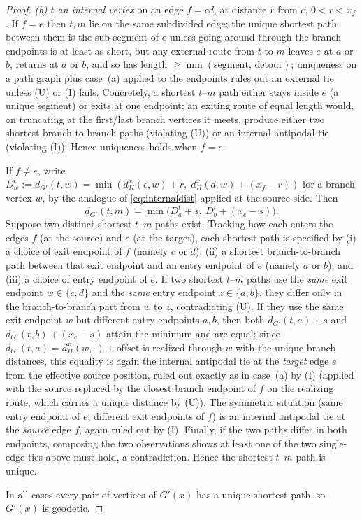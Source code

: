 \documentclass{amsart}
\theoremstyle{definition}
\begin{document}
\begin{proof}
\emph{(b) $t$ an internal vertex} on an edge $f=cd$, at distance $r$ from $c$,
$0<r<x_f$. If $f=e$ then $t,m$ lie on the same subdivided edge; the unique
shortest path between them is the sub-segment of $e$ unless going around through
the branch endpoints is at least as short, but any external route from $t$ to
$m$ leaves $e$ at $a$ or $b$, returns at $a$ or $b$, and so has length
$\ge\min(\text{segment},\,\text{detour})$; uniqueness on a path graph plus
case~(a) applied to the endpoints rules out an external tie unless (U) or (I)
fails. Concretely, a shortest $t$--$m$ path either stays inside $e$ (a unique
segment) or exits at one endpoint; an exiting route of equal length would, on
truncating at the first/last branch vertices it meets, produce either two
shortest branch-to-branch paths (violating (U)) or an internal antipodal tie
(violating (I)). Hence uniqueness holds when $f=e$.

If $f\ne e$, write $D^t_w:=d_{G'}(t,w)=\min(d^x_H(c,w)+r,\;d^x_H(d,w)+(x_f-r))$
for a branch vertex $w$, by the analogue of \eqref{eq:internaldist} applied at
the source side. Then
\[
d_{G'}(t,m)=\min\big(D^t_a+s,\ D^t_b+(x_e-s)\big).
\]
Suppose two distinct shortest $t$--$m$ paths exist. Tracking how each enters the
edges $f$ (at the source) and $e$ (at the target), each shortest path is
specified by (i) a choice of exit endpoint of $f$ (namely $c$ or $d$), (ii) a
shortest branch-to-branch path between that exit endpoint and an entry endpoint
of $e$ (namely $a$ or $b$), and (iii) a choice of entry endpoint of $e$. If two
shortest $t$--$m$ paths use the \emph{same} exit endpoint $w\in\{c,d\}$ and the
\emph{same} entry endpoint $z\in\{a,b\}$, they differ only in the
branch-to-branch part from $w$ to $z$, contradicting (U). If they use the same
exit endpoint $w$ but different entry endpoints $a,b$, then both
$d_{G'}(t,a)+s$ and $d_{G'}(t,b)+(x_e-s)$ attain the minimum and are equal; since
$d_{G'}(t,a)=d^x_H(w,\cdot)+\text{offset}$ is realized through $w$ with the unique
branch distances, this equality is again the internal antipodal tie at the
\emph{target} edge $e$ from the effective source position, ruled out exactly as
in case~(a) by (I) (applied with the source replaced by the closest branch
endpoint of $f$ on the realizing route, which carries a unique distance by (U)).
The symmetric situation (same entry endpoint of $e$, different exit endpoints of
$f$) is an internal antipodal tie at the \emph{source} edge $f$, again ruled out
by (I). Finally, if the two paths differ in both endpoints, composing the two
observations shows at least one of the two single-edge ties above must hold, a
contradiction. Hence the shortest $t$--$m$ path is unique.

In all cases every pair of vertices of $G'(x)$ has a unique shortest path, so
$G'(x)$ is geodetic.
\end{proof}
\end{document}
